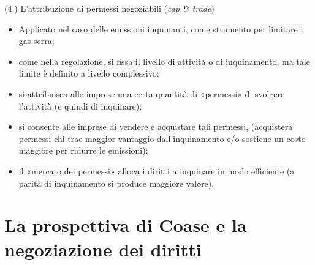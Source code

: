\documentclass[aspectratio=64,12pt]{beamer}
\begin{document}
\begin{frame}{(4.) L'attribuzione di permessi negoziabili (\emph{cap \& trade})}
\begin{itemize}
\item Applicato nel caso delle emissioni inquinanti, come strumento per limitare i gas serra;
\item come nella regolazione, si fissa il livello di attività o di inquinamento, ma tale limite è definito a livello complessivo;
\item si attribuisca alle imprese una certa quantità di «permessi» di svolgere l'attività (e quindi di inquinare);
\item si consente alle imprese di vendere e acquistare tali permessi, (acquisterà permessi chi trae maggior vantaggio dall'inquinamento e/o sostiene un costo maggiore per ridurre le emissioni);
\item il «mercato dei permessi» alloca i diritti a inquinare in modo efficiente (a parità di inquinamento si produce maggiore valore).
\end{itemize}
\end{frame}

\section{La prospettiva di Coase e la negoziazione dei diritti}
\end{document}
